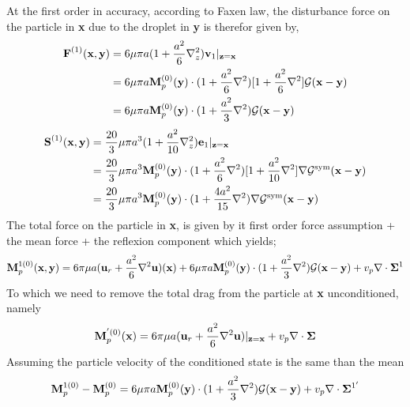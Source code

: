 \documentclass[12pt]{My_preprint}
\begin{document}
At the first order in accuracy, according to Faxen law, the disturbance force on the particle in  \textbf{x} due to the droplet in \textbf{y} is therefor given by, 
\begin{align}
    \textbf{F}^{(1)}(\textbf{x},\textbf{y}) 
    &=
    6\mu \pi a (1 + \frac{a^2}{6}\mathbf{\nabla}^2_z ) \textbf{v}_1|_{\textbf{z}=\textbf{x}}\\
    &=
    6\mu \pi a 
    \textbf{M}_p^{(0)}(\textbf{y})\cdot
    (1 + \frac{a^2}{6}\mathbf{\nabla}^2 )
    [1+ \frac{a^2}{6}\mathbf{\nabla}^2]\mathcal{G}(\textbf{x}-\textbf{y})\\
    &=
    6\mu \pi a 
    \textbf{M}_p^{(0)}(\textbf{y})\cdot
    (1 + \frac{a^2}{3}\mathbf{\nabla}^2 )\mathcal{G}(\textbf{x}-\textbf{y})
\end{align}
\begin{align}
    \textbf{S}^{(1)}(\textbf{x},\textbf{y}) 
    &=
    \frac{20}{3} \mu \pi a^3 (1 + \frac{a^2}{10}\mathbf{\nabla}^2_z ) \textbf{e}_1|_{\textbf{z}=\textbf{x}}\\
    &=
    \frac{20}{3} \mu \pi a^3
    \textbf{M}_p^{(0)}(\textbf{y})\cdot
    (1 + \frac{a^2}{6}\mathbf{\nabla}^2 )
    [1+ \frac{a^2}{10}\mathbf{\nabla}^2]\mathbf{\nabla}\mathcal{G}^\text{sym}(\textbf{x}-\textbf{y})\\
    &=
    \frac{20}{3} \mu \pi a^3
    \textbf{M}_p^{(0)}(\textbf{y})\cdot
    (1 + \frac{4a^2}{15}\mathbf{\nabla}^2 )\mathbf{\nabla}\mathcal{G}^\text{sym}(\textbf{x}-\textbf{y})
\end{align}
The total force on the particle in \textbf{x}, is given by it first order force assumption + the mean force + the reflexion component which yields; 
\begin{equation}
    \textbf{M}_p^{1(0)}(\textbf{x},\textbf{y})
    =
    6\pi\mu a (\textbf{u}_r + \frac{a^2}{6}\mathbf{\nabla}^2\textbf{u})(\textbf{x})
    + 
    6\mu \pi a 
    \textbf{M}_p^{(0)}(\textbf{y})\cdot
    (1 + \frac{a^2}{3}\mathbf{\nabla}^2 )\mathcal{G}(\textbf{x}-\textbf{y})
    + v_p \mathbf{\nabla}\cdot\bm\Sigma^1
\end{equation} 
To which we need to remove the total drag from the particle at \textbf{x} unconditioned, namely 
\begin{equation}
    \textbf{M}_p^{'(0)}(\textbf{x})
    =
    6\pi\mu a (\textbf{u}_r + \frac{a^2}{6}\mathbf{\nabla}^2\textbf{u})|_{\textbf{z}=\textbf{x}}
    + 
    v_p \mathbf{\nabla}\cdot\bm\Sigma
\end{equation}
Assuming the particle velocity of the conditioned state is the same than the mean 
\begin{equation}
    \textbf{M}_p^{1(0)} - \textbf{M}_p^{(0)}
    =
    6\mu \pi a 
    \textbf{M}_p^{(0)}(\textbf{y})\cdot
    (1 + \frac{a^2}{3}\mathbf{\nabla}^2 )\mathcal{G}(\textbf{x}-\textbf{y})
    + v_p \mathbf{\nabla}\cdot\bm\Sigma^{1'}
\end{equation}
\end{document}
